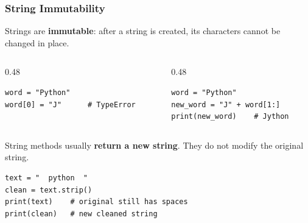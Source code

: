 \documentclass[aspectratio=169,10pt]{beamer}
\newcommand{\keyword}[1]{\textcolor{PrimaryBlue}{\textbf{#1}}}
\begin{document}
\begin{frame}[fragile]
\frametitle{String Immutability}
\small
Strings are \keyword{immutable}: after a string is created, its characters cannot be changed in place.

\vspace{0.15cm}
\begin{columns}[T,totalwidth=0.96\textwidth]
\begin{column}{0.48\textwidth}
\begin{tcolorbox}[lecturebox,title=This does not work]
\begin{lstlisting}[style=pycodesmall]
word = "Python"
word[0] = "J"      # TypeError
\end{lstlisting}
\end{tcolorbox}
\end{column}
\begin{column}{0.48\textwidth}
\begin{tcolorbox}[lecturebox,title=Create a new string]
\begin{lstlisting}[style=pycodesmall]
word = "Python"
new_word = "J" + word[1:]
print(new_word)    # Jython
\end{lstlisting}
\end{tcolorbox}
\end{column}
\end{columns}

\vspace{0.2cm}
\begin{tcolorbox}[lecturebox,title=Beginner takeaway]
String methods usually \keyword{return a new string}. They do not modify the original string.
\end{tcolorbox}

\begin{lstlisting}[style=pycode]
text = "  python  "
clean = text.strip()
print(text)    # original still has spaces
print(clean)   # new cleaned string
\end{lstlisting}
\end{frame}
\end{document}
